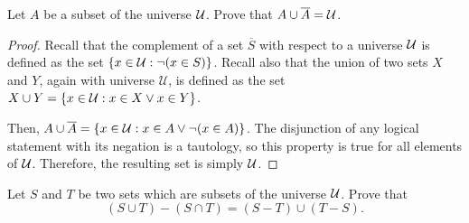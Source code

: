 
\question Let $A$ be a subset of the universe $\mathcal{U}$.
Prove that $A \cup \overline{A} = \mathcal{U}$.

\begin{proof}
  Recall that the complement of a set $\overline{S}$ with respect to a universe $\mathcal{U}$
  is defined as the set $\{x\in\mathcal{U}:\lnot(x\in S)\}$.
  Recall also that the union of two sets $X$ and $Y$, again with universe $\mathcal U$,
  is defined as the set $X\cup Y=\{x\in\mathcal{U}:x\in X\lor x\in Y\}$.

  Then, $A \cup \overline{A} = \{x\in\mathcal{U}:x \in A \lor \lnot (x \in A)\}$.
  The disjunction of any logical statement with its negation is a tautology, so this property is true for all elements of $\mathcal{U}$.
  Therefore, the resulting set is simply $\mathcal{U}$.
\end{proof}


\question\label{distribute} Let $S$ and $T$ be two sets which are subsets of the universe $\mathcal{U}$.
Prove that \[ (S \cup T) - (S \cap T) = (S - T) \cup (T - S). \]

